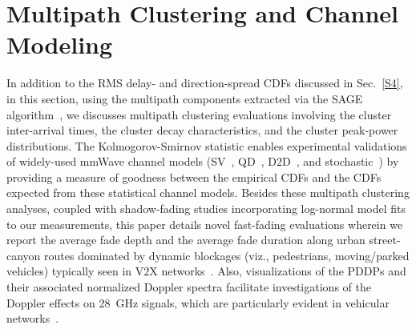 \documentclass[12pt, draftcls, onecolumn]{IEEEtran}
\begin{document}
\section{Multipath Clustering and Channel Modeling}\label{S5}
In addition to the RMS delay- and direction-spread CDFs discussed in Sec.~\ref{S4}, in this section, using the multipath components extracted via the SAGE algorithm~\cite{SAGE}, we discusses multipath clustering evaluations involving the cluster inter-arrival times, the cluster decay characteristics, and the cluster peak-power distributions. The Kolmogorov-Smirnov statistic enables experimental validations of widely-used mmWave channel models (SV~\cite{Indoor60G}, QD~\cite{QDC_NIST}, D$2$D~\cite{NISTModeling, D2DHumanBlockage}, and stochastic~\cite{Indoor60G}) by providing a measure of goodness between the empirical CDFs and the CDFs expected from these statistical channel models. Besides these multipath clustering analyses, coupled with shadow-fading studies incorporating log-normal model fits to our measurements, this paper details novel fast-fading evaluations wherein we report the average fade depth and the average fade duration along urban street-canyon routes dominated by dynamic blockages (viz., pedestrians, moving/parked vehicles) typically seen in V$2$X networks~\cite{V2XBlockages}. Also, visualizations of the PDDPs and their associated normalized Doppler spectra facilitate investigations of the Doppler effects on \SI{28}{\giga\hertz} signals, which are particularly evident in vehicular networks~\cite{DopplerHST}.
\end{document}
